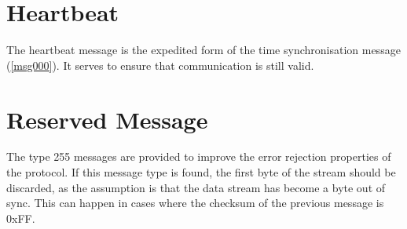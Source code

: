 \section{Heartbeat}
\label{msg128}
The heartbeat message is the expedited form of the time synchronisation message (\ref{msg000}). It serves to ensure that communication is still valid.

\section{Reserved Message}
\label{msg255}
The type 255 messages are provided to improve the error rejection properties of the protocol. If this message type is found, the first byte of the stream should be discarded, as the assumption is that the data stream has become a byte out of sync. This can happen in cases where the checksum of the previous message is 0xFF.
